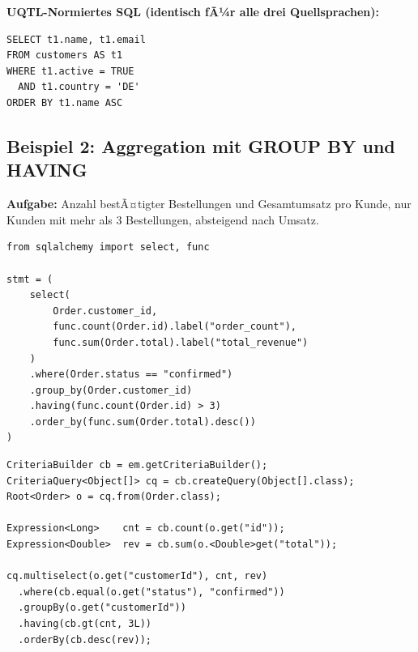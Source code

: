\begin{successbox}
\textbf{UQTL-Normiertes SQL (identisch fÃ¼r alle drei Quellsprachen):}
\begin{lstlisting}[style=sqlstyle, numbers=none]
SELECT t1.name, t1.email
FROM customers AS t1
WHERE t1.active = TRUE
  AND t1.country = 'DE'
ORDER BY t1.name ASC
\end{lstlisting}
\end{successbox}

\subsection{Beispiel 2: Aggregation mit GROUP BY und HAVING}
\label{subsec:bsp2}

\textbf{Aufgabe:} Anzahl bestÃ¤tigter Bestellungen und Gesamtumsatz pro Kunde,
nur Kunden mit mehr als 3 Bestellungen, absteigend nach Umsatz.

\begin{lstlisting}[style=pythonstyle, caption={Beispiel 2 -- Python},
  label=lst:bsp2_py]
from sqlalchemy import select, func

stmt = (
    select(
        Order.customer_id,
        func.count(Order.id).label("order_count"),
        func.sum(Order.total).label("total_revenue")
    )
    .where(Order.status == "confirmed")
    .group_by(Order.customer_id)
    .having(func.count(Order.id) > 3)
    .order_by(func.sum(Order.total).desc())
)
\end{lstlisting}

\begin{lstlisting}[style=javastyle, caption={Beispiel 2 -- Java},
  label=lst:bsp2_java]
CriteriaBuilder cb = em.getCriteriaBuilder();
CriteriaQuery<Object[]> cq = cb.createQuery(Object[].class);
Root<Order> o = cq.from(Order.class);

Expression<Long>    cnt = cb.count(o.get("id"));
Expression<Double>  rev = cb.sum(o.<Double>get("total"));

cq.multiselect(o.get("customerId"), cnt, rev)
  .where(cb.equal(o.get("status"), "confirmed"))
  .groupBy(o.get("customerId"))
  .having(cb.gt(cnt, 3L))
  .orderBy(cb.desc(rev));
\end{lstlisting}

